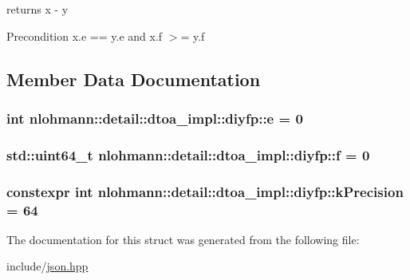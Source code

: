 returns x -\/ y 

\begin{DoxyPrecond}{Precondition}
x.\+e == y.\+e and x.\+f $>$= y.\+f 
\end{DoxyPrecond}


\subsection{Member Data Documentation}
\subsubsection[{\texorpdfstring{e}{e}}]{\setlength{\rightskip}{0pt plus 5cm}int nlohmann\+::detail\+::dtoa\+\_\+impl\+::diyfp\+::e = 0}\hypertarget{structnlohmann_1_1detail_1_1dtoa__impl_1_1diyfp_ae22e170815983961447c429f324c944d}{}\label{structnlohmann_1_1detail_1_1dtoa__impl_1_1diyfp_ae22e170815983961447c429f324c944d}
\subsubsection[{\texorpdfstring{f}{f}}]{\setlength{\rightskip}{0pt plus 5cm}std\+::uint64\+\_\+t nlohmann\+::detail\+::dtoa\+\_\+impl\+::diyfp\+::f = 0}\hypertarget{structnlohmann_1_1detail_1_1dtoa__impl_1_1diyfp_aea90459e340a231ca31d46946803ef51}{}\label{structnlohmann_1_1detail_1_1dtoa__impl_1_1diyfp_aea90459e340a231ca31d46946803ef51}
\subsubsection[{\texorpdfstring{k\+Precision}{kPrecision}}]{\setlength{\rightskip}{0pt plus 5cm}constexpr int nlohmann\+::detail\+::dtoa\+\_\+impl\+::diyfp\+::k\+Precision = 64\hspace{0.3cm}{\ttfamily [static]}}\hypertarget{structnlohmann_1_1detail_1_1dtoa__impl_1_1diyfp_a03682754b06ed4f30b263119eecc2d52}{}\label{structnlohmann_1_1detail_1_1dtoa__impl_1_1diyfp_a03682754b06ed4f30b263119eecc2d52}


The documentation for this struct was generated from the following file\+:\begin{DoxyCompactItemize}
\item 
include/\hyperlink{json_8hpp}{json.\+hpp}\end{DoxyCompactItemize}
